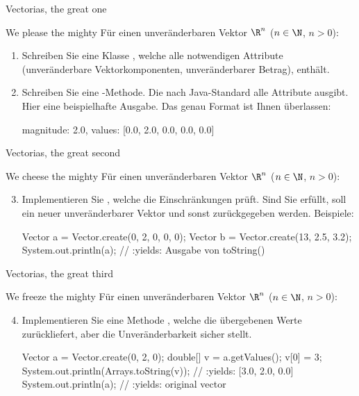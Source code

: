 \begin{frame}[fragile, c]{Vectorias, the great one}
\begin{aufgabe}{We please the mighty}
Für einen unveränderbaren Vektor \(\R^n\) (\(n \in \N\), \(n > 0\)): \begin{enumerate}[<+(1)->]
    \item Schreiben Sie eine Klasse , welche alle notwendigen Attribute (unveränderbare Vektorkomponenten, unveränderbarer Betrag), enthält.
    \item Schreiben Sie eine -Methode. Die nach Java-Standard alle Attribute ausgibt.\pause{} Hier eine beispielhafte Ausgabe. Das genau Format ist Ihnen überlassen:
\begin{plainjava}
{ magnitude: 2.0, values: [0.0, 2.0, 0.0, 0.0, 0.0] }
\end{plainjava}
\end{enumerate}
\end{aufgabe}
\end{frame}

\begin{frame}[fragile, c]{Vectorias, the great second}
\begin{aufgabe}{We cheese the mighty}
Für einen unveränderbaren Vektor \(\R^n\) (\(n \in \N\), \(n > 0\)): \begin{enumerate}[<+(1)->]
    \setcounter{enumi}{2}
    \item Implementieren Sie , welche die Einschränkungen prüft. Sind Sie erfüllt, soll ein neuer unveränderbarer Vektor und sonst  zurückgegeben werden.\pause{} Beispiele:
\begin{plainjava}
Vector a = Vector.create(0, 2, 0, 0, 0);
Vector b = Vector.create(13, 2.5, 3.2);
System.out.println(a); // :yields: Ausgabe von toString()
\end{plainjava}
\end{enumerate}
\end{aufgabe}
\end{frame}

\begin{frame}[fragile, c]{Vectorias, the great third}
\begin{aufgabe}{We freeze the mighty}
\pause Für einen unveränderbaren Vektor \(\R^n\) (\(n \in \N\), \(n > 0\)): \begin{enumerate}[<+(1)->]
    \setcounter{enumi}{3}
    \item Implementieren Sie eine Methode , welche die übergebenen Werte zurückliefert, aber die Unveränderbarkeit sicher stellt.\pause{}
\begin{plainjava}
Vector a = Vector.create(0, 2, 0);
double[] v = a.getValues();
v[0] = 3;
System.out.println(Arrays.toString(v)); // :yields: [3.0, 2.0, 0.0]
System.out.println(a); // :yields: original vector
\end{plainjava}
\end{enumerate}
\end{aufgabe}
\end{frame}


